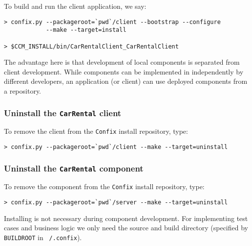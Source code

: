 To build and run the client application, we say:
\begin{small}
\begin{verbatim}
> confix.py --packageroot=`pwd`/client --bootstrap --configure 
            --make --target=install

> $CCM_INSTALL/bin/CarRentalClient_CarRentalClient
\end{verbatim}
\end{small}

The advantage here is that development of local components is separated from
client development. 
While components can be implemented in independently by different developers, an
application (or client) can use deployed components from a repository.


\newpage
\subsubsection{Uninstall the {\tt CarRental} client}

To remove the client from the {\tt Confix} install repository, type:

\begin{small}
\begin{verbatim}
> confix.py --packageroot=`pwd`/client --make --target=uninstall
\end{verbatim}
\end{small}




\subsubsection{Uninstall the {\tt CarRental} component}

To remove the component from the {\tt Confix} install repository, type:

\begin{small}
\begin{verbatim}
> confix.py --packageroot=`pwd`/server --make --target=uninstall
\end{verbatim}
\end{small}

Installing is not necessary during component development. 
For implementing test cases and business logic we only need the source and
build directory (specified by {\tt BUILDROOT} in {\tt ~/.confix}).
 
